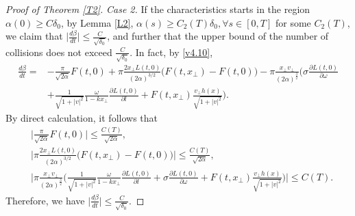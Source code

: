 \documentclass[11pt,reqno]{amsart}%
\theoremstyle{definition}
\theoremstyle{remark}
\begin{document}
\begin{proof}[Proof of Theorem \ref{T2}]
  {\em Case 2.} If the characteristics starts in the region $\alpha(0)\geq C\delta_{0}$,  by Lemma \ref{L2}, $\alpha (s)\geq C_{2}(T)\delta_{0}, \forall s\in [0,T]$ for some $C_{2}(T)$,  we claim that $\Big|\frac{d \beta}{ d t}\Big|\leq \frac{C}{\sqrt{\delta_{0}}}$, and further that the upper bound of the number of collisions does not exceed $\frac{C}{\sqrt{\delta_{0}}}$.
  In fact, by \eqref{v4.10},
  \begin{align}
\frac{d \beta }{d t}=&-\frac{\pi}{\sqrt{2\alpha}}F(t,0)+\pi\frac{2x_{\bot}L(t,0)}{(2\alpha)^{3/2}}\big(F(t,x_{\bot})-F(t,0)\big)-\pi \frac{x_{\bot}v_{\bot}}{(2\alpha)^{\frac{3}{2}}}
 \Big(\sigma \frac{\partial L(t,0)}{\partial\omega}\nonumber\\
   &+\frac{1}{\sqrt{1+|v|^{2}}}\frac{\omega}{1-k x_{\bot}}
  \frac{\partial L(t,0)}{\partial l}+F(t,x_{\bot})\frac{v_{\bot}h(x)}{\sqrt{1+|v|^{2}}}\Big).\nonumber
 \end{align}
 By direct calculation, it follows that
 \begin{align}
&\Big|\frac{\pi}{\sqrt{2\alpha}}F(t,0)\Big|\leq \frac{C(T)}{\sqrt{2\alpha}},\nonumber\\
&\Big|\pi\frac{2x_{\bot}L(t,0)}{(2\alpha)^{3/2}}\big(F(t,x_{\bot})-F(t,0)\big)\Big|\leq \frac{C(T)}{\sqrt{2\alpha}},\nonumber\\
&\Big|\pi \frac{x_{\bot}v_{\bot}}{(2\alpha)^{\frac{3}{2}}}
 \Big(\frac{1}{\sqrt{1+|v|^{2}}}
   \frac{\omega}{1-k x_{\bot}}
  \frac{\partial L(t,0)}{\partial l}+\sigma \frac{\partial L(t,0)}{\partial\omega}+F(t,x_{\bot})\frac{v_{\bot}h(x)}{\sqrt{1+|v|^{2}}}\Big)\Big|
  \leq C(T).\nonumber
 \end{align}
Therefore, we have $\Big|\frac{d \beta}{ d t}\Big|\leq \frac{C}{\sqrt{\delta_{0}}}.$


\end{proof}
\end{document}
